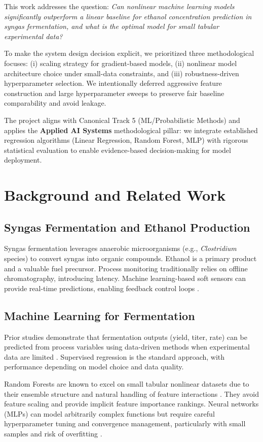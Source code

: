 \documentclass[conference]{IEEEtran}
\begin{document}
This work addresses the question: \textit{Can nonlinear machine learning models significantly outperform a linear baseline for ethanol concentration prediction in syngas fermentation, and what is the optimal model for small tabular experimental data?}

To make the system design decision explicit, we prioritized three methodological focuses: (i) scaling strategy for gradient-based models, (ii) nonlinear model architecture choice under small-data constraints, and (iii) robustness-driven hyperparameter selection. We intentionally deferred aggressive feature construction and large hyperparameter sweeps to preserve fair baseline comparability and avoid leakage.

The project aligns with Canonical Track 5 (ML/Probabilistic Methods) and applies the \textbf{Applied AI Systems} methodological pillar: we integrate established regression algorithms (Linear Regression, Random Forest, MLP) with rigorous statistical evaluation to enable evidence-based decision-making for model deployment.

\section{Background and Related Work}

\subsection{Syngas Fermentation and Ethanol Production}
Syngas fermentation leverages anaerobic microorganisms (e.g., \textit{Clostridium} species) to convert syngas into organic compounds. Ethanol is a primary product and a valuable fuel precursor. Process monitoring traditionally relies on offline chromatography, introducing latency. Machine learning-based soft sensors can provide real-time predictions, enabling feedback control loops \cite{roell2022}.

\subsection{Machine Learning for Fermentation}
Prior studies demonstrate that fermentation outputs (yield, titer, rate) can be predicted from process variables using data-driven methods when experimental data are limited \cite{roell2022}. Supervised regression is the standard approach, with performance depending on model choice and data quality.

Random Forests are known to excel on small tabular nonlinear datasets due to their ensemble structure and natural handling of feature interactions \cite{breiman2001}. They avoid feature scaling and provide implicit feature importance rankings. Neural networks (MLPs) can model arbitrarily complex functions but require careful hyperparameter tuning and convergence management, particularly with small samples and risk of overfitting \cite{rumelhart1986}.
\end{document}

